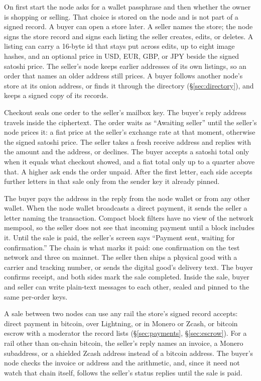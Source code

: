 On first start the node asks for a wallet passphrase and then whether the owner is shopping or selling. That choice is stored on the node and is not part of a signed record. A buyer can open a store later. A seller names the store; the node signs the store record and signs each listing the seller creates, edits, or deletes. A listing can carry a 16-byte id that stays put across edits, up to eight image hashes, and an optional price in USD, EUR, GBP, or JPY beside the signed satoshi price. The seller's node keeps earlier addresses of its own listings, so an order that names an older address still prices. A buyer follows another node's store at its onion address, or finds it through the directory (\S\ref{sec:directory}), and keeps a signed copy of its records.

Checkout seals one order to the seller's mailbox key. The buyer's reply address travels inside the ciphertext. The order waits as ``Awaiting seller'' until the seller's node prices it: a fiat price at the seller's exchange rate at that moment, otherwise the signed satoshi price. The seller takes a fresh receive address and replies with the amount and the address, or declines. The buyer accepts a satoshi total only when it equals what checkout showed, and a fiat total only up to a quarter above that. A higher ask ends the order unpaid. After the first letter, each side accepts further letters in that sale only from the sender key it already pinned.

The buyer pays the address in the reply from the node wallet or from any other wallet. When the node wallet broadcasts a direct payment, it sends the seller a letter naming the transaction. Compact block filters have no view of the network mempool, so the seller does not see that incoming payment until a block includes it. Until the sale is paid, the seller's screen says ``Payment sent, waiting for confirmation.'' The chain is what marks it paid: one confirmation on the test network and three on mainnet. The seller then ships a physical good with a carrier and tracking number, or sends the digital good's delivery text. The buyer confirms receipt, and both sides mark the sale completed. Inside the sale, buyer and seller can write plain-text messages to each other, sealed and pinned to the same per-order keys.

A sale between two nodes can use any rail the store's signed record accepts: direct payment in bitcoin, over Lightning, or in Monero or Zcash, or bitcoin escrow with a moderator the record lists (\S\ref{sec:payments}, \S\ref{sec:escrow}). For a rail other than on-chain bitcoin, the seller's reply names an invoice, a Monero subaddress, or a shielded Zcash address instead of a bitcoin address. The buyer's node checks the invoice or address and the arithmetic, and, since it need not watch that chain itself, follows the seller's status replies until the sale is paid.

